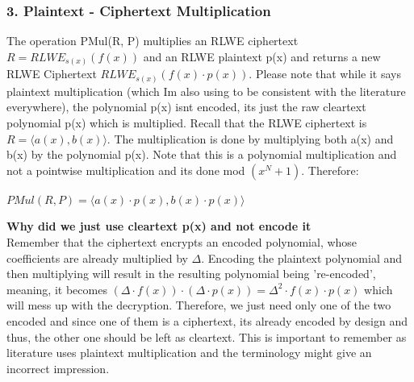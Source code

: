 \documentclass{report}
\begin{document}
		\subsubsection{3. Plaintext - Ciphertext Multiplication}
		The operation PMul(R, P) multiplies an RLWE ciphertext $R = RLWE_{s(x)} (f(x))$ and an RLWE plaintext p(x) and returns a new RLWE Ciphertext $RLWE_{s(x)} (f(x) \cdot p(x))$. Please note that while it says plaintext multiplication (which Im also using to be consistent with the literature everywhere), the polynomial p(x) isnt encoded, its just the raw cleartext polynomial p(x) which is multiplied. Recall that the RLWE  ciphertext is $R = \langle a(x), b(x) \rangle$. The multiplication is done by multiplying both a(x) and b(x) by the polynomial p(x). Note that this is a polynomial multiplication and not a pointwise multiplication and its done mod $(x^N + 1)$. Therefore:
		\begin{center}
			$PMul(R, P) = \langle a(x) \cdot p(x), b(x) \cdot p(x) \rangle$
		\end{center}
		\textbf{Why did we just use cleartext p(x) and not encode it}\\
		Remember that the ciphertext encrypts an encoded polynomial, whose coefficients are already multiplied by $\Delta$. Encoding the plaintext polynomial and then multiplying will result in the resulting polynomial being 're-encoded', meaning, it becomes $(\Delta \cdot f(x)) \cdot (\Delta \cdot p(x)) = \Delta^2 \cdot f(x) \cdot p(x)$ which will mess up with the decryption. Therefore, we just need only one of the two encoded and since one of them is a ciphertext, its already encoded by design and thus, the other one should be left as cleartext. This is important to remember as literature uses plaintext multiplication and the terminology might give an incorrect impression.
\end{document}
